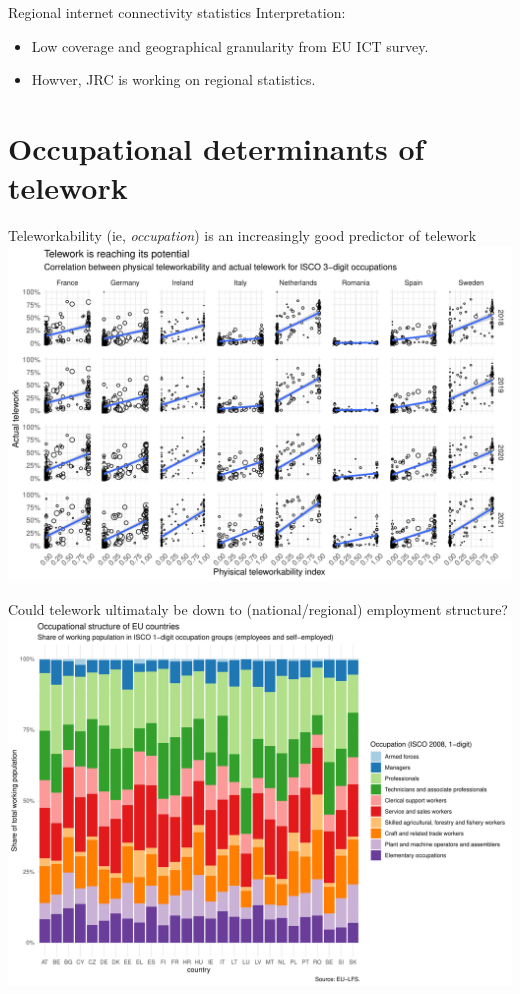 \documentclass[10pt]{beamer}
\begin{document}
\begin{frame}{Regional internet connectivity statistics}
Interpretation:
\begin{itemize}
\item Low coverage and geographical granularity from EU ICT survey.
\item Howver, JRC is working on regional statistics.
\end{itemize}
\end{frame}

\section{Occupational determinants of telework}

\begin{frame}{Teleworkability (ie, \emph{occupation}) is an increasingly good predictor of telework}
\pause
\centering
\includegraphics[width=\textwidth,height=0.9\textheight,keepaspectratio]{Correlation_teleworkability_telework_selected.pdf}
\end{frame}


\begin{frame}{Could telework ultimataly be down to (national/regional) employment structure?}
\pause
\centering
\includegraphics[width=\textwidth,height=0.9\textheight,keepaspectratio]{LFS_occup_structure.pdf}
\end{frame}
\end{document}
